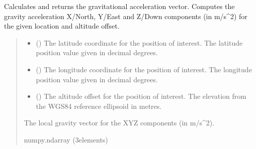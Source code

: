 \documentclass[letterpaper,10pt,english]{sphinxmanual}
\begin{document}
\begin{fulllineitems}
\begin{fulllineitems}
\end{fulllineitems}


\begin{fulllineitems}
\label{\detokenize{modules/gravity/map:qnav.gravity.map.GravityMap.calc_gravity_xyz}}
\pysigstartsignatures
{}
\pysigstopsignatures
\sphinxAtStartPar
Calculates and returns the gravitational acceleration vector.
Computes the gravity acceleration X/North, Y/East and Z/Down
components (in m/s\textasciicircum{}2) for the given location and altitude offset.
\begin{quote}\begin{description}
\begin{itemize}
\item {} 
\sphinxAtStartPar
{} () \textendash{} The latitude coordinate for the position of interest.
The latitude position value given in decimal degrees.

\item {} 
\sphinxAtStartPar
{} () \textendash{} The longitude coordinate for the position of interest.
The longitude position value given in decimal degrees.

\item {} 
\sphinxAtStartPar
{} () \textendash{} The altitude offset for the position of interest.
The elevation from the WGS\sphinxhyphen{}84 reference ellipsoid in metres.

\end{itemize}

\sphinxAtStartPar
The local gravity vector for the XYZ components (in m/s\textasciicircum{}2).

\sphinxAtStartPar
numpy.ndarray (3\sphinxhyphen{}elements)


\end{description}
\end{quote}
\end{fulllineitems}
\end{fulllineitems}
\end{document}
